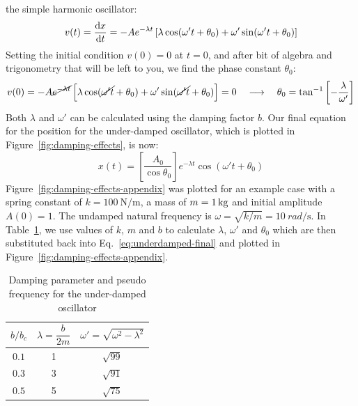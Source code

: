 the simple harmonic oscillator:
\begin{equation}
  v(t)=\diff xt
  = -Ae^{-\lambda t}\left[
    \lambda\cos(\omega't+\theta_0)
    +\omega'\sin(\omega't+\theta_0)
    \right]
  \label{eq:appendix-damped-velocity}
\end{equation}
Setting the initial condition $v(0)=0$ at $t=0$, and after bit of algebra and
trigonometry that will be left to you, we find the phase constant $\theta_0$:
\begin{equation}
  v(0) =-A\cancel{e^{-\lambda t}}
  \left[
    \lambda\cos(\cancel{\omega't}+\theta_0)+
    \omega'\sin(\cancel{\omega't}+\theta_0)
    \right]=0
  \quad\longrightarrow\quad
  \theta_0 =\tan^{-1}\left[-\frac\lambda{\omega'}\right]
\end{equation}
Both $\lambda$ and $\omega'$ can be calculated using the damping factor $b$.
Our final equation for the position for the under-damped oscillator, which is
plotted in Figure~\ref{fig:damping-effects}, is now:
\begin{equation}
  x(t)=\left[\frac{A_0}{\cos\theta_0}\right] e^{-\lambda t}\cos(\omega't+\theta_0)
  \label{eq:underdamped-final}
\end{equation}
Figure~\ref{fig:damping-effects-appendix} was plotted for an example case with a
spring constant of $k=\SI{100}{\newton\per\metre}$, a mass of
$m=\SI1{\kilo\gram}$ and initial amplitude $A(0)=1$. The undamped natural
frequency is $\omega=\sqrt{k/m}=\SI{10}{rad\per\second}$. In
Table~\ref{tabl:damping-parameters}, we use values of $k$, $m$ and $b$ to
calculate $\lambda$, $\omega'$ and $\theta_0$ which are then substituted back
into Eq.~\ref{eq:underdamped-final} and plotted in
Figure~\ref{fig:damping-effects-appendix}.
\begin{table}[ht]
  \centering
  \begin{tabular}{ccc}
    {\sffamily$b/b_c$} &
    {\sffamily$\lambda=\dfrac b{2m}$} &
    {\sffamily$\omega'=\sqrt{\omega^2-\lambda^2}$} \\
    \hline\hline
    $0.1$ & 1 & $\sqrt{99}$ \\
    $0.3$ & 3 & $\sqrt{91}$ \\
    $0.5$ & 5 & $\sqrt{75}$ \\
    \hline
  \end{tabular}
  \caption{Damping parameter and pseudo frequency for the under-damped
    oscillator}
  \label{tabl:damping-parameters}
\end{table}
